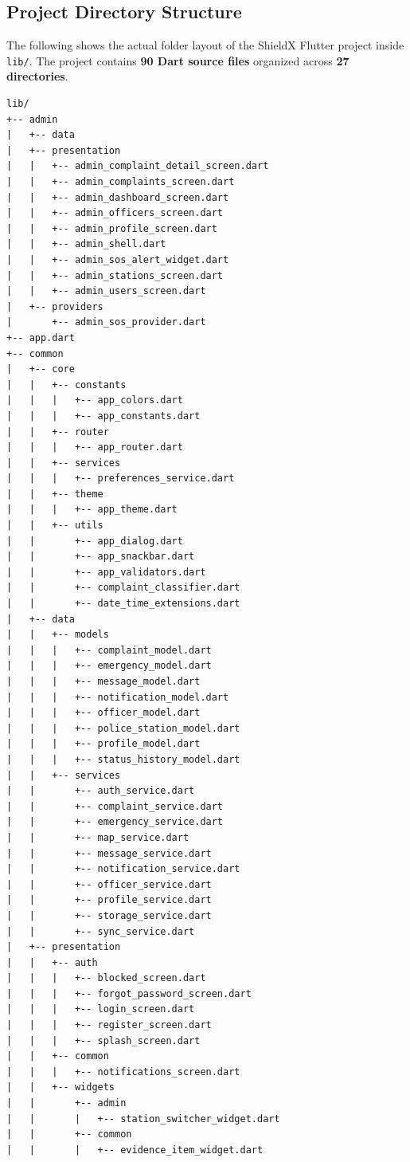 \documentclass[12pt, a4paper, twoside, openany]{report}
\begin{document}
\subsection{Project Directory Structure}
The following shows the actual folder layout of the ShieldX Flutter project inside \texttt{lib/}. The project contains \textbf{90 Dart source files} organized across \textbf{27 directories}.
\begin{footnotesize}
\begin{verbatim}
lib/
+-- admin
|   +-- data
|   +-- presentation
|   |   +-- admin_complaint_detail_screen.dart
|   |   +-- admin_complaints_screen.dart
|   |   +-- admin_dashboard_screen.dart
|   |   +-- admin_officers_screen.dart
|   |   +-- admin_profile_screen.dart
|   |   +-- admin_shell.dart
|   |   +-- admin_sos_alert_widget.dart
|   |   +-- admin_stations_screen.dart
|   |   +-- admin_users_screen.dart
|   +-- providers
|       +-- admin_sos_provider.dart
+-- app.dart
+-- common
|   +-- core
|   |   +-- constants
|   |   |   +-- app_colors.dart
|   |   |   +-- app_constants.dart
|   |   +-- router
|   |   |   +-- app_router.dart
|   |   +-- services
|   |   |   +-- preferences_service.dart
|   |   +-- theme
|   |   |   +-- app_theme.dart
|   |   +-- utils
|   |       +-- app_dialog.dart
|   |       +-- app_snackbar.dart
|   |       +-- app_validators.dart
|   |       +-- complaint_classifier.dart
|   |       +-- date_time_extensions.dart
|   +-- data
|   |   +-- models
|   |   |   +-- complaint_model.dart
|   |   |   +-- emergency_model.dart
|   |   |   +-- message_model.dart
|   |   |   +-- notification_model.dart
|   |   |   +-- officer_model.dart
|   |   |   +-- police_station_model.dart
|   |   |   +-- profile_model.dart
|   |   |   +-- status_history_model.dart
|   |   +-- services
|   |       +-- auth_service.dart
|   |       +-- complaint_service.dart
|   |       +-- emergency_service.dart
|   |       +-- map_service.dart
|   |       +-- message_service.dart
|   |       +-- notification_service.dart
|   |       +-- officer_service.dart
|   |       +-- profile_service.dart
|   |       +-- storage_service.dart
|   |       +-- sync_service.dart
|   +-- presentation
|   |   +-- auth
|   |   |   +-- blocked_screen.dart
|   |   |   +-- forgot_password_screen.dart
|   |   |   +-- login_screen.dart
|   |   |   +-- register_screen.dart
|   |   |   +-- splash_screen.dart
|   |   +-- common
|   |   |   +-- notifications_screen.dart
|   |   +-- widgets
|   |       +-- admin
|   |       |   +-- station_switcher_widget.dart
|   |       +-- common
|   |       |   +-- evidence_item_widget.dart

\end{verbatim}
\end{footnotesize}
\end{document}
